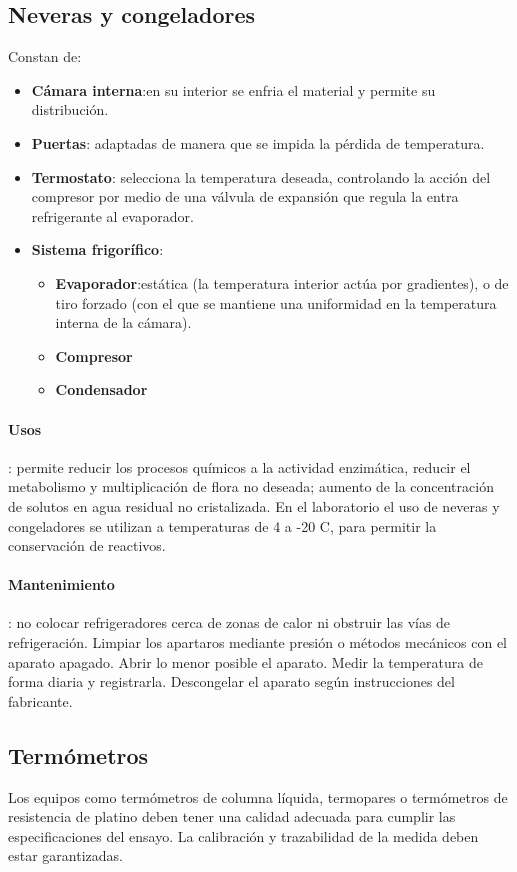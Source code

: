 \subsection{Neveras y congeladores}
Constan de:
\begin{itemize}[itemsep=0pt,parsep=0pt,topsep=0pt,partopsep=0pt]
    \item \textbf{Cámara interna}:en su interior se enfria el material y permite su distribución.
    \item\textbf{Puertas}: adaptadas de manera que se impida la pérdida de temperatura.
    \item\textbf{Termostato}: selecciona la temperatura deseada, controlando la acción del compresor por medio de una válvula de expansión que regula la entra refrigerante al evaporador.
    \item\textbf{Sistema frigorífico}:
    \begin{itemize}[itemsep=0pt,parsep=0pt,topsep=0pt,partopsep=0pt]
        \item \textbf{Evaporador}:estática (la temperatura interior actúa por gradientes), o de tiro forzado (con el que se mantiene una uniformidad en la temperatura interna de la cámara).
        \item\textbf{Compresor}
        \item\textbf{Condensador}
    \end{itemize}
\end{itemize}
\paragraph{Usos}: permite reducir los procesos químicos a la actividad enzimática, reducir el metabolismo y multiplicación de flora no deseada; aumento de la concentración de solutos en agua residual no cristalizada. En el laboratorio el uso de neveras y congeladores se utilizan a temperaturas de 4 a -20 C, para permitir la conservación de reactivos.
\paragraph{Mantenimiento}: no colocar refrigeradores cerca de zonas de calor ni obstruir las vías de refrigeración. Limpiar los apartaros mediante presión o métodos mecánicos con el aparato apagado. Abrir lo menor posible el aparato. Medir la temperatura de forma diaria y registrarla. Descongelar el aparato según instrucciones del fabricante. 
\subsection{Termómetros}
Los equipos como termómetros de columna líquida, termopares o termómetros de resistencia de platino deben tener una calidad adecuada para cumplir las especificaciones del ensayo. La calibración y trazabilidad de la medida deben estar garantizadas.

